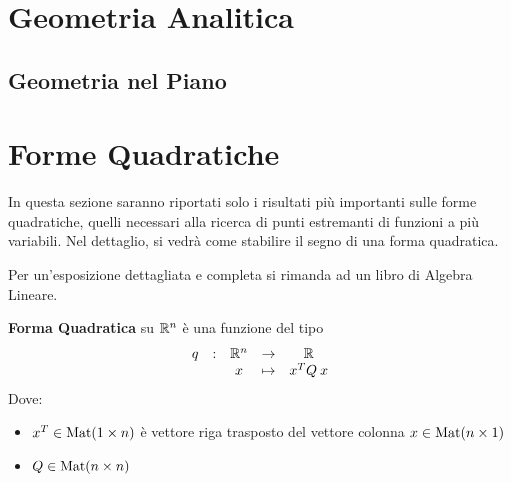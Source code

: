\renewcommand{\thesection}{\Alph{section}} %
\begin{appendices}
\section{Geometria Analitica}
\subsection{Geometria nel Piano}\label{sect:geom_piano}

\newpage
\section{Forme Quadratiche}\label{sect:for_quadr}
In questa sezione saranno riportati solo i risultati più importanti sulle forme quadratiche, quelli necessari alla ricerca di punti estremanti di funzioni a più variabili. Nel dettaglio, si vedrà come stabilire il segno di una forma quadratica.

Per un'esposizione dettagliata e completa si rimanda ad un libro di Algebra Lineare.

\begin{definition}
	\label{def:form_quadr}
	\textbf{Forma Quadratica} su $\mathbb{R}^n$ è una funzione del tipo
	\[\begin{array}{ccccc} {q} & : & {\mathbb{R}^n} & \to & {\mathbb{R}} \\ & & {x} & \mapsto & {x^T Q \: x} \\ \end{array}\]
	Dove:
	\begin{itemize}[noitemsep]
		\item $x^T \in \operatorname{Mat}(1 \times n)$ è vettore riga trasposto del vettore colonna $x \in \operatorname{Mat}(n \times 1)$
		\item $Q \in \operatorname{Mat}(n \times n)$
	\end{itemize}


\end{definition}
\end{appendices}

